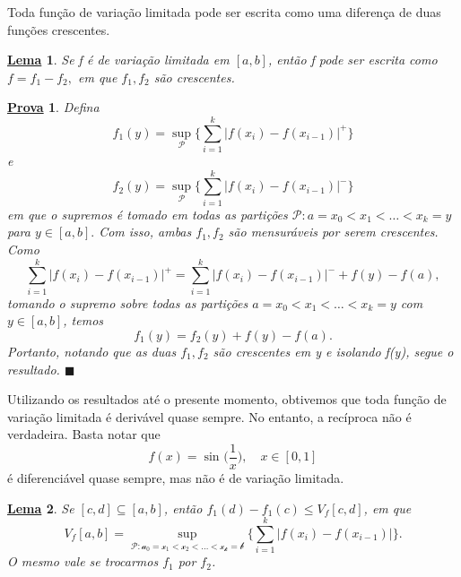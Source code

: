 \documentclass{article}
\newtheorem*{lemma*}{\underline{Lema}}
\newtheorem*{proof*}{\underline{Prova}}
\renewcommand\qedsymbol{$\blacksquare$}
\begin{document}
  Toda função de variação limitada pode ser escrita como uma diferença de duas funções crescentes.
 \begin{lemma*}
   Se f é de variação limitada em \([a, b]\), então f pode ser escrita como \(f= f_1 - f_2,\) em que \(f_1, f_2\) são crescentes.
 \end{lemma*}
\begin{proof*}
  Defina 
    \[
      f_1(y) = \sup_{\mathcal{P}}\biggl\{\sum\limits_{i=1}^{k}|f(x_{i})-f(x_{i-1})|^{+}\biggr\}
    \]
  e 
    \[
      f_2(y) = \sup_{\mathcal{P}}\biggl\{\sum\limits_{i=1}^{k}|f(x_{i})-f(x_{i-1})|^{-}\biggr\}
    \]
    em que o supremos é tomado em todas as partições \(\mathcal{P}: a = x_{0} < x_1 < \dotsc < x_{k} = y\) para \(y\in [a, b].\) Com isso, ambas \(f_1, f_2\) são mensuráveis por serem crescentes. 
Como 
  \[
    \sum\limits_{i=1}^{k}|f(x_{i}) - f(x_{i-1})|^{+} = \sum\limits_{i=1}^{k}|f(x_{i}) - f(x_{i-1})|^{-} + f(y) - f(a),
  \]
  tomando o supremo sobre todas as partições \(a=x_{0} < x_1 <\dotsc <x_{k} = y\) com \(y\in [a, b]\), temos 
    \[
      f_1(y) = f_2(y) + f(y) - f(a).
    \]
    Portanto, notando que as duas \(f_1, f_2\) são crescentes em y e isolando f(y), segue o resultado. \qedsymbol
\end{proof*}
  Utilizando os resultados até o presente momento, obtivemos que toda função de variação limitada é derivável quase sempre. No entanto, a recíproca não é verdadeira. Basta notar que 
    \[
      f(x) = \sin^{}{\biggl(\frac{1}{x}\biggr)},\quad x\in [0, 1]
    \]
  é diferenciável quase sempre, mas não é de variação limitada.
 \begin{lemma*}
   Se \([c, d]\subseteq [a, b]\), então \(f_1(d) - f_1(c)\leq V_f[c, d]\), em que 
     \[
       V_f[a, b] = \sup_{\mathcal{P:a_{0}=x_1 < x_2 < \dotsc <x_{k}=b}}\biggl\{\sum\limits_{i=1}^{k}|f(x_{i}) - f(x_{i-1})|\biggr\}.
     \]
  O mesmo vale se trocarmos \(f_1\) por \(f_2\).
 \end{lemma*}
\end{document}
